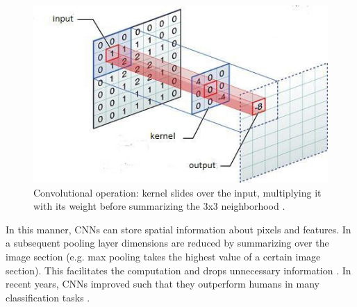 \documentclass[12pt,letterpaper]{article}
\begin{document}
\begin{figure}
	\centering
	\includegraphics[width=.48\textwidth]{cnn.png}
	\caption{Convolutional operation: kernel slides over the input, multiplying it with its weight before summarizing the 3x3 neighborhood \citep{Escontrela.2018}.}
	\label{convolut}
\end{figure}
In this manner, CNNs can store spatial information about pixels and features. In a subsequent pooling layer dimensions are reduced by summarizing over the image section (e.g. max pooling takes the highest value of a certain image section). This facilitates the computation and drops unnecessary information \citep{Lecture.2019}. In recent years, CNNs improved such that they outperform humans in many classification tasks \citep{Russakovsky.2014}.
\end{document}
